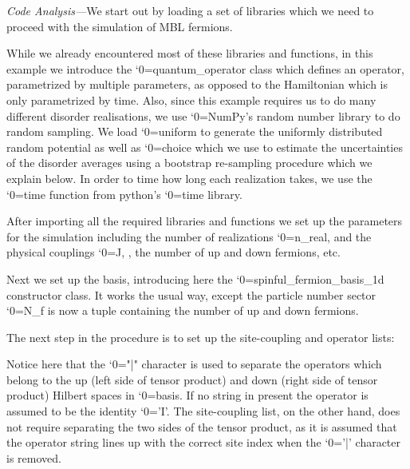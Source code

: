 \documentclass{SciPost}
\newcommand\0{\scalebox{-1}[1]{0}}
\let\svttfamily\ttfamily
\renewcommand\ttfamily{\svttfamily\catcode`0=\active }
\renewcommand\texttt{\bgroup\ttfamily\texttthelp}
\def\texttthelp#1{#1\egroup}
\newcommand{\MBLcode}{example6.py}
\begin{document}
\noindent\emph{Code Analysis---}We start out by loading a set of libraries which we need to proceed with the simulation of MBL fermions. 

While we already encountered most of these libraries and functions, in this example we introduce the \texttt{quantum\_operator} class which defines an operator, parametrized by multiple parameters, as opposed to the Hamiltonian which is only parametrized by time. Also, since this example requires us to do many different disorder realisations, we use \texttt{NumPy}'s random number library to do random sampling. We load \texttt{uniform} to generate the uniformly distributed random potential as well as \texttt{choice} which we use to estimate the uncertainties of the disorder averages using a bootstrap re-sampling procedure which we explain below. In order to time how long each realization takes, we use the \texttt{time} function from python's \texttt{time} library. 

After importing all the required libraries and functions we set up the parameters for the simulation including the number of realizations \texttt{n\_real}, and the physical couplings \texttt{J}, , the number of up and down fermions, etc.

Next we set up the basis, introducing here the \texttt{spinful\_fermion\_basis\_1d} constructor class. It works the usual way, except the particle number sector \texttt{N\_f} is now a tuple containing the number of up and down fermions. 

The next step in the procedure is to set up the site-coupling and operator lists:

Notice here that the \texttt{"|"} character is used to separate the operators which belong to the up (left side of tensor product) and down (right side of tensor product) Hilbert spaces in \texttt{basis}. If no string in present the operator is assumed to be the identity \texttt{'I'}. The site-coupling list, on the other hand, does not require separating the two sides of the tensor product, as it is assumed that the operator string lines up with the correct site index when the \texttt{'|'} character is removed. 
\end{document}
